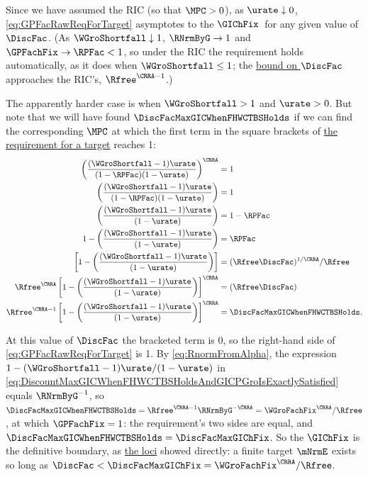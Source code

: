 \documentclass{econark}
\begin{document}
Since we have assumed the RIC (so that $\MPC > 0$), as $\urate \downarrow 0$, \eqref{eq:GPFacRawReqForTarget} asymptotes to the $\GIChFix$~for any given value of $\DiscFac$.  (As $\WGroShortfall \downarrow 1$, $\RNrmByG \rightarrow 1$ and $\GPFachFix \rightarrow \RPFac < 1$, so under the RIC the requirement holds automatically, as it does when $\WGroShortfall \leq 1$; the \hyperref[eq:DiscountMaxGICWhenFHWCTBSHoldsAndGICPGroIsExactlySatisfied]{bound on $\DiscFac$} approaches the RIC's, $\Rfree^{\CRRA-1}$.)  

The apparently harder case is when $\WGroShortfall>1$ and $\urate > 0$.  But note that we will have found $\DiscFacMaxGICWhenFHWCTBSHolds$ if we can find the corresponding $\MPC$ at which the first term in the square brackets of \hyperref[eq:GPFacRawReqForTarget]{the requirement for a target} reaches 1:
\begin{equation}\begin{gathered}\begin{aligned}
    \left(\frac{(\WGroShortfall-1)\urate}{(1-\RPFac) (1-\urate)}\right)^{\CRRA} & =  1
\\  \left(\frac{(\WGroShortfall-1)\urate}{(1-\RPFac) (1-\urate)}\right) & =  1
\\  \left(\frac{(\WGroShortfall-1)\urate}{ (1-\urate)}\right) & =  1-\RPFac
\\  1-\left(\frac{(\WGroShortfall-1)\urate}{ (1-\urate)}\right) & =  \RPFac
\\                  \left[1-\left(\frac{(\WGroShortfall-1)\urate}{ (1-\urate)}\right)\right] & =  (\Rfree \DiscFac)^{1/\CRRA}/\Rfree
\\  \Rfree^{\CRRA}  \left[1-\left(\frac{(\WGroShortfall-1)\urate}{ (1-\urate)}\right)\right]^{\CRRA} & =  (\Rfree \DiscFac)
\\  \Rfree^{\CRRA-1}\left[1-\left(\frac{(\WGroShortfall-1)\urate}{ (1-\urate)}\right)\right]^{\CRRA} & =  \DiscFacMaxGICWhenFHWCTBSHolds \label{eq:DiscountMaxGICWhenFHWCTBSHoldsAndGICPGroIsExactlySatisfied}
.\end{aligned}\end{gathered}\end{equation}

At this value of $\DiscFac$ the bracketed term is 0, so the right-hand side of \eqref{eq:GPFacRawReqForTarget} is 1.  By \eqref{eq:RnormFromAlpha}, the expression $1-(\WGroShortfall-1)\urate/(1-\urate)$ in \eqref{eq:DiscountMaxGICWhenFHWCTBSHoldsAndGICPGroIsExactlySatisfied} equals $\RNrmByG^{-1}$, so $\DiscFacMaxGICWhenFHWCTBSHolds = \Rfree^{\CRRA-1}\RNrmByG^{-\CRRA} = \WGroFachFix^{\CRRA}/\Rfree$, at which $\GPFachFix = 1$: the requirement's two sides are equal, and $\DiscFacMaxGICWhenFHWCTBSHolds=\DiscFacMaxGIChFix$.  So the $\GIChFix$ is the definitive boundary, as \hyperref[sec:TractableBufferStock-LociCross]{the loci} showed directly: a finite target $\mNrmE$ exists so long as $\DiscFac < \DiscFacMaxGIChFix = \WGroFachFix^{\CRRA}/\Rfree$.
\end{document}
